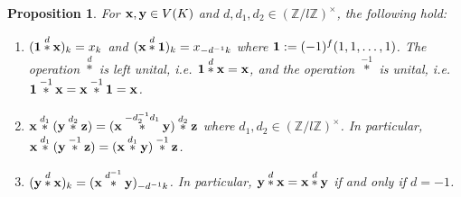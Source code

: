 \documentclass[a4paper, 11pt]{amsart}
\newcommand{\Z}{\mathbb Z}
\theoremstyle{plain}
\newtheorem{prop}[thm]{Proposition}
\theoremstyle{definition}
\numberwithin{equation}{section}
\begin{document}
\begin{prop}\label{prop:CA}
For ${\bf x}, {\bf y} \in V(K)$ and $d,d_1,d_2\in (\Z/l\Z)^\times$,  the following hold: 
\begin{enumerate}
\item [$(1)$]  $({\bf 1}\overset{d}{\ast}{\bf x})_k=x_k$ and $({\bf x}\overset{d}{\ast}{\bf 1})_k=x_{-d^{-1}k}$ where ${\bf 1} := (-1)^{f}(1,1,\dots,1)$. 
The operation $\overset{d}{\ast}$ is left unital, i.e. ${\bf 1}\overset{d}{\ast}{\bf x}= {\bf x}$, and the operation $\overset{-1}{\ast}$ is unital, i.e. ${\bf 1}\overset{-1}{\ast}{\bf x}= {\bf x}\overset{-1}{\ast}{\bf 1}={\bf x}$.
\item [$(2)$] ${\bf x}\overset{d_1}{\ast}({\bf y}\overset{d_2}{\ast}{\bf z})=({\bf x}\overset{-d_2^{-1}d_1}{\ast}{\bf y})\overset{d_2}{\ast}{\bf z}$ where $d_1, d_2 \in (\Z/l\Z)^{\times}$. 
In particular, ${\bf x}\overset{d_1}{\ast}({\bf y}\overset{-1}{\ast}{\bf z})=({\bf x}\overset{d_1}{\ast}{\bf y})\overset{-1}{\ast}{\bf z}$.
\item [$(3)$] $({\bf y}\overset{d}{\ast}{\bf x})_k=({\bf x}\overset{d^{-1}}{\ast}{\bf y})_{-d^{-1}k}$. 
In particular, ${\bf y}\overset{d}{\ast}{\bf x}={\bf x}\overset{d}{\ast}{\bf y}$ if and only if $d=-1$.
\end{enumerate}
\end{prop}
\end{document}

